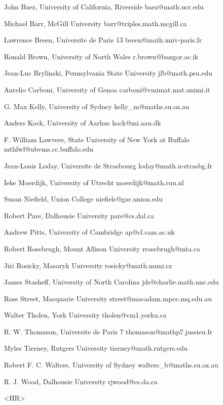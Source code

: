 John Baez, University of California, Riverside
baez@math.ucr.edu
 
Michael Barr, McGill University
barr@triples.math.mcgill.ca
 
Lawrence Breen, Universite de Paris 13
breen@math.univ-paris.fr
 
Ronald Brown, University of North Wales 
r.brown@bangor.ac.ik
 
Jean-Luc Brylinski, Pennsylvania State University
jlb@math.psu.edu
 
Aurelio Carboni, University of Genoa
carboni@vmimat.mat.unimi.it
 
G. Max Kelly, University of Sydney
kelly_m@maths.su.oz.au
 
Anders Kock, University of Aarhus
kock@mi.aau.dk
 
F. William Lawvere, State University of New York at Buffalo
mthfwl@ubvms.cc.buffalo.edu
 
Jean-Louis Loday, Universite de Strasbourg
loday@math.u-strasbg.fr
 
Ieke Moerdijk, University of Utrecht
moerdijk@math.ruu.nl
 
Susan Niefield, Union College
niefiels@gar.union.edu
 
Robert Pare, Dalhousie University
pare@cs.dal.ca
 
Andrew Pitts, University of Cambridge
ap@cl.cam.ac.uk
 
Robert Rosebrugh, Mount Allison University
rrosebrugh@mta.ca
 
Jiri Rosicky, Masaryk University
rosicky@math.muni.cz
 
James Stasheff, University of North Carolina
jds@charlie.math.unc.edu
 
Ross Street, Macquarie University 
street@macadam.mpce.mq.edu.au
 
Walter Tholen, York University
tholen@vm1.yorku.ca
 
R. W. Thomason, Universite de Paris 7
thomason@mathp7.jussieu.fr
 
Myles Tierney, Rutgers University
tierney@math.rutgers.edu
 
Robert F. C. Walters, University of Sydney
walters_b@maths.su.oz.au
 
R. J. Wood, Dalhousie University
rjwood@cs.da.ca
$$
    
<HR>



